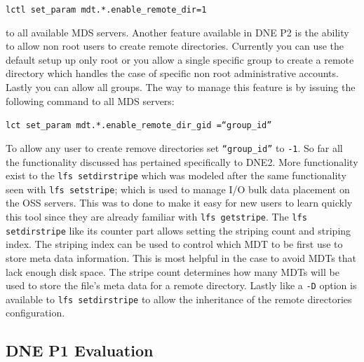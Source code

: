 \documentclass[conference,compsoc]{IEEEtran}
\begin{document}
{\footnotesize{\texttt{lctl set\_param mdt.*.enable\_remote\_dir=1}}}

to all available MDS servers. Another feature available in DNE P2 is the
ability to allow non root users to create remote directories. Currently you can
use the default setup up only root or you allow a single specific group to
create a remote directory which handles the case of specific non root
administrative accounts. Lastly you can allow all groups. The way to manage
this feature is by issuing the following command to all MDS servers:

{\footnotesize{\texttt{{lct set\_param mdt.*.enable\_remote\_dir\_gid
=``group\_id''}}}} 

To allow any user to create remove directories set {\footnotesize{\texttt{``group\_id''}}} to {\footnotesize{\texttt{-1}}}. So far all
the functionality discussed has pertained specifically to DNE2. More
functionality exist to the {\footnotesize{\texttt{lfs setdirstripe}}} which was modeled after the same
functionality seen with {\footnotesize{\texttt{lfs setstripe}}}; which is used to manage I/O bulk data
placement on the OSS servers. This was to done to make it easy for new users to
learn quickly this tool since they are already familiar with {\footnotesize{\texttt{lfs getstripe}}}. The
{\footnotesize{\texttt{{lfs setdirstripe}}}} like its counter part allows setting the striping count and
striping index. The striping index can be used to control which MDT to be first
use to store meta data information. This is most helpful in the case to avoid
MDTs that lack enough disk space. The stripe count determines how many MDTs
will be used to store the file's meta data for a remote directory. Lastly like
a {\footnotesize{\texttt{{-D}}}} option is available to {\footnotesize{\texttt{{lfs setdirstripe}}}} to allow the inheritance of the
remote directories configuration.




\subsection{DNE P1 Evaluation}
\end{document}
